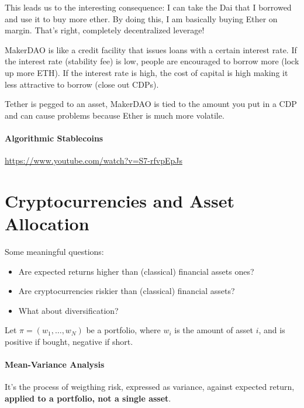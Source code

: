 This leads us to the interesting consequence: I can take the Dai that I borrowed and use it to buy more ether. By doing this, I am basically buying Ether on margin. That's right, completely decentralized leverage!

MakerDAO is like a credit facility that issues loans with a certain interest rate. If the interest rate (stability fee) is low, people are encouraged to borrow more (lock up more ETH). If the interest rate is high, the cost of capital is high making it less attractive to borrow (close out CDPs).

Tether is pegged to an asset, MakerDAO is tied to the amount you put in a CDP and can cause problems because Ether is much more volatile.


\paragraph{Algorithmic Stablecoins}\leavevmode
\url{https://www.youtube.com/watch?v=S7-rfvpEpJs}



\section{Cryptocurrencies and Asset Allocation}

Some meaningful questions:
\begin{itemize}
	\item Are expected returns higher than (classical) financial assets ones?
	\item Are cryptocurrencies riskier than (classical) financial assets?
	\item What about diversification?
\end{itemize}

Let $\pi =(w_{1},\ldots,w_{N})$ be a portfolio, where $w_{i}$ is the amount of asset $i$, and is positive if bought, negative if short.

\paragraph{Mean-Variance Analysis}

It's the process of weigthing risk, expressed as variance, against expected return, \textbf{applied to a portfolio, not a single asset}.

